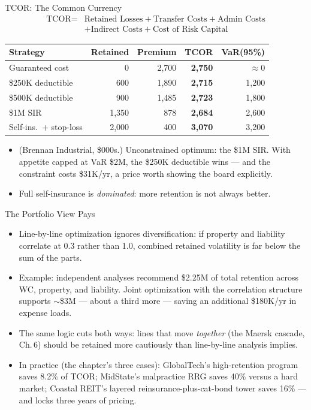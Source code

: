 \documentclass[11pt, aspectratio=169]{beamer}
\begin{document}
\begin{frame}{TCOR: The Common Currency}
\[
\begin{aligned}
\text{TCOR} ={}& \text{Retained Losses} + \text{Transfer Costs} + \text{Admin Costs} \\
&+ \text{Indirect Costs} + \text{Cost of Risk Capital}
\end{aligned}
\]
\begin{center}\small
\begin{tabular}{@{}lrrrr@{}}
\toprule
\textbf{Strategy} & \textbf{Retained} & \textbf{Premium} & \textbf{TCOR} & \textbf{VaR(95\%)} \\
\midrule
Guaranteed cost & 0 & 2{,}700 & \textbf{2{,}750} & $\approx 0$ \\
\$250K deductible & 600 & 1{,}890 & \textbf{2{,}715} & 1{,}200 \\
\$500K deductible & 900 & 1{,}485 & \textbf{2{,}723} & 1{,}800 \\
\$1M SIR & 1{,}350 & 878 & \textbf{2{,}684} & 2{,}600 \\
Self-ins.\ + stop-loss & 2{,}000 & 400 & \textbf{3{,}070} & 3{,}200 \\
\bottomrule
\end{tabular}
\end{center}
\medskip
\begin{itemize}
  \item (Brennan Industrial, \$000s.) Unconstrained optimum: the \$1M SIR. With appetite capped at VaR \$2M, the \$250K deductible wins --- and the constraint \alert{costs \$31K/yr}, a price worth showing the board explicitly.
  \item Full self-insurance is \emph{dominated}: more retention is not always better.
\end{itemize}
\end{frame}

\begin{frame}{The Portfolio View Pays}
\begin{itemize}
  \item Line-by-line optimization ignores diversification: if property and liability correlate at 0.3 rather than 1.0, combined retained volatility is far below the sum of the parts.
  \item Example: independent analyses recommend \$2.25M of total retention across WC, property, and liability. Joint optimization with the correlation structure supports $\sim$\$3M --- about a third more --- saving \alert{an additional \$180K/yr} in expense loads.
  \item The same logic cuts both ways: lines that move \emph{together} (the Maersk cascade, Ch.\,6) should be retained more cautiously than line-by-line analysis implies.
  \item In practice (the chapter's three cases): GlobalTech's high-retention program saves 8.2\% of TCOR; MidState's malpractice RRG saves 40\% versus a hard market; Coastal REIT's layered reinsurance-plus-cat-bond tower saves 16\% --- and locks three years of pricing.
\end{itemize}
\end{frame}
\end{document}
